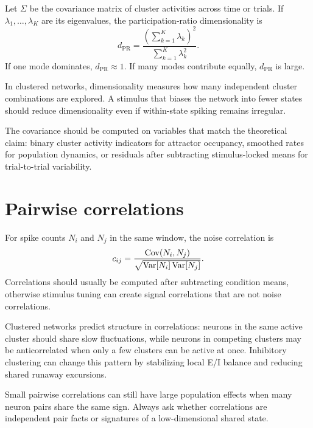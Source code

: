 Let $\Sigma$ be the covariance matrix of cluster activities across time or trials. If $\lambda_1,\ldots,\lambda_K$ are its eigenvalues, the participation-ratio dimensionality is
%
\begin{equation}
  d_{\mathrm{PR}}
  =
  \frac{\left(\sum_{k=1}^K \lambda_k\right)^2}
       {\sum_{k=1}^K \lambda_k^2}.
  \label{eq:participation-ratio}
\end{equation}
%
If one mode dominates, $d_{\mathrm{PR}}\approx 1$. If many modes contribute equally, $d_{\mathrm{PR}}$ is large.

In clustered networks, dimensionality measures how many independent cluster combinations are explored. A stimulus that biases the network into fewer states should reduce dimensionality even if within-state spiking remains irregular.

The covariance should be computed on variables that match the theoretical claim: binary cluster activity indicators for attractor occupancy, smoothed rates for population dynamics, or residuals after subtracting stimulus-locked means for trial-to-trial variability.

\section{Pairwise correlations}
\label{sec:pairwise-correlations}

For spike counts $N_i$ and $N_j$ in the same window, the noise correlation is
%
\begin{equation}
  c_{ij}=
  \frac{\operatorname{Cov}(N_i,N_j)}
       {\sqrt{\operatorname{Var}[N_i]\operatorname{Var}[N_j]}}.
  \label{eq:pairwise-count-correlation}
\end{equation}
%
Correlations should usually be computed after subtracting condition means, otherwise stimulus tuning can create signal correlations that are not noise correlations.

Clustered networks predict structure in correlations: neurons in the same active cluster should share slow fluctuations, while neurons in competing clusters may be anticorrelated when only a few clusters can be active at once. Inhibitory clustering can change this pattern by stabilizing local E/I balance and reducing shared runaway excursions.

Small pairwise correlations can still have large population effects when many neuron pairs share the same sign. Always ask whether correlations are independent pair facts or signatures of a low-dimensional shared state.

